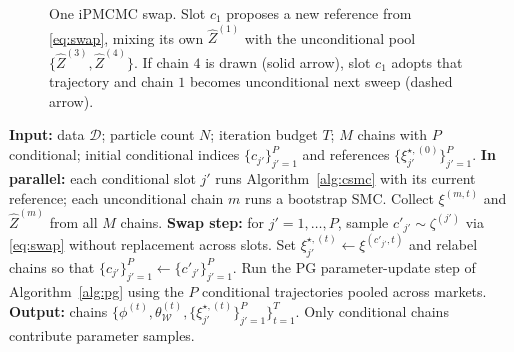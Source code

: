 \begin{figure}[t]
\centering
{}
\caption{One iPMCMC swap. Slot $c_1$ proposes a new reference from \eqref{eq:swap}, mixing its own $\widehat Z^{(1)}$ with the unconditional pool $\{\widehat Z^{(3)}, \widehat Z^{(4)}\}$. If chain $4$ is drawn (solid arrow), slot $c_1$ adopts that trajectory and chain $1$ becomes unconditional next sweep (dashed arrow).}
\label{fig:swap}
\end{figure}

\begin{algorithm}[t]
\caption{iPMCMC}\label{alg:ipmcmc}
\begin{algorithmic}[1]
\STATE \textbf{Input:} data $\mathcal{D}$; particle count $N$; iteration budget $T$; $M$ chains with $P$ conditional; initial conditional indices $\{c_{j'}\}_{j'=1}^P$ and references $\{\xi^{\star,(0)}_{j'}\}_{j'=1}^P$.
  \STATE \textbf{In parallel:} each conditional slot $j'$ runs Algorithm~\ref{alg:csmc} with its current reference; each unconditional chain $m$ runs a bootstrap SMC. Collect $\xi^{(m,t)}$ and $\widehat Z^{(m)}$ from all $M$ chains.
  \STATE \textbf{Swap step:} for $j' = 1, \dots, P$, sample $c'_{j'} \sim \zeta^{(j')}$ via \eqref{eq:swap} without replacement across slots.
  \STATE Set $\xi^{\star,(t)}_{j'} \gets \xi^{(c'_{j'}, t)}$ and relabel chains so that $\{c_{j'}\}_{j'=1}^P \gets \{c'_{j'}\}_{j'=1}^P$.
  \STATE Run the PG parameter-update step of Algorithm~\ref{alg:pg} using the $P$ conditional trajectories pooled across markets.
\ENDFOR
\STATE \textbf{Output:} chains $\{\phi^{(t)}, \theta^{(t)}_{\mathcal{W}}, \{\xi^{\star,(t)}_{j'}\}_{j'=1}^P\}_{t=1}^T$. Only conditional chains contribute parameter samples.
\end{algorithmic}
\end{algorithm}

